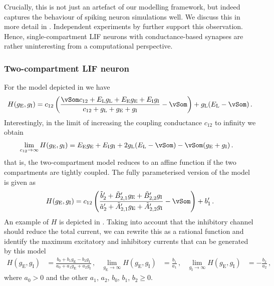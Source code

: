 Crucially, this is not just an artefact of our modelling framework, but indeed captures the behaviour of spiking neuron simulations well.
We discuss this in more detail in \citet{stockel2017point}.
Independent experiments by \citet{kiselev2020approximating} further support this observation.
Hence, single-compartment LIF neurons with conductance-based synapses are rather uninteresting from a computational perspective.

\subsubsection{Two-compartment LIF neuron}
For the model depicted in  we have
\begin{align}
	H(g_\mathrm{E}, g_\mathrm{I}) = c_{12} \left(\frac{\vSom c_\mathrm{12} + E_\mathrm{L} g_\mathrm{L} + E_\mathrm{E} g_\mathrm{E} + E_\mathrm{I} g_\mathrm{I}}{c_\mathrm{12} + g_\mathrm{L} + g_\mathrm{E} + g_\mathrm{I}} - \vSom \right) + g_\mathrm{L}(E_\mathrm{L} - \vSom) \,.
	\label{eqn:two_comp_lif_natural}
\end{align}
Interestingly, in the limit of increasing the coupling conductance $c_{12}$ to infinity we obtain
\begin{align*}
	\lim_{c_{12} \to \infty} H(g_\mathrm{E}, g_\mathrm{I}) &= 
		E_\mathrm{E} g_\mathrm{E} + E_\mathrm{I} g_\mathrm{I} + 2 g_\mathrm{L} (E_\mathrm{L} - \vSom) - \vSom (g_\mathrm{E} + g_\mathrm{I}) \,.
\end{align*}
that is, the two-compartment model reduces to an affine function if the two compartments are tightly coupled.
The fully parameterised version of the model is given as
\begin{align*}
	H(g_\mathrm{E}, g_\mathrm{I}) =
		c_{12} \left(\frac{
			\tilde b'_2 + \tilde B'_{2, 1} g_\mathrm{E} + \tilde B'_{2, 2} g_\mathrm{I}
		}{
			\tilde a'_2 + \tilde A'_{2, 1} g_\mathrm{E} + \tilde A'_{2, 2} g_\mathrm{I}
		} - \vSom \right) + b'_1 \,.
\end{align*}
An example of $H$ is depicted in .
Taking into account that the inhibitory channel should reduce the total current, we can rewrite this as a rational function and identify the maximum excitatory and inhibitory currents that can be generated by this model
\begin{align}
	H(g_\mathrm{E}, g_\mathrm{I}) &=
		\frac{
	        b_0 + b_1 g_\mathrm{E} - b_2 g_\mathrm{I}
        }{
	        a_0 + a_1 g_\mathrm{E} + a_2 g_\mathrm{I}
        } \,,
	& \lim_{g_\mathrm{E} \to \infty} H(g_\mathrm{E}, g_\mathrm{I}) &= \frac{b_1}{a_1} \,,
	& \lim_{g_\mathrm{I} \to \infty} H(g_\mathrm{E}, g_\mathrm{I}) &= -\frac{b_2}{a_2} \,,
	\label{eqn:two_comp_lif}
\end{align}
where $a_0 > 0$ and the other $a_1$, $a_2$, $b_0$, $b_1$, $b_2 \geq 0$.

